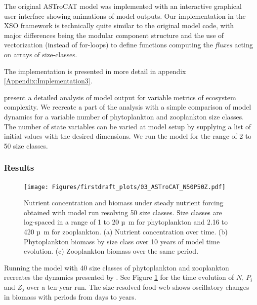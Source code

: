 \documentclass[journal abbreviation, manuscript]{copernicus}
\begin{document}
The original ASTroCAT model was implemented with an interactive graphical user interface showing animations of model outputs. Our implementation in the XSO framework is technically quite similar to the original model code, with major differences being the modular component structure and the use of vectorization (instead of for-loops) to define functions computing the \textit{fluxes} acting on arrays of size-classes.

The implementation is presented in more detail in appendix \ref{Appendix:Implementation3}.

\citet{Banas2011b} present a detailed analysis of model output for variable metrics of ecosystem complexity. We recreate a part of the analysis with a simple comparison of model dynamics for a variable number of phytoplankton and zooplankton size classes. The number of state variables can be varied at model setup by supplying a list of initial values with the desired dimensions. We run the model for the range of 2 to 50 size classes.

\subsubsection{Results}
\begin{figure}[t]
\texttt{[image: Figures/firstdraft\_plots/03\_ASTroCAT\_N50P50Z.pdf]}
\caption{Nutrient concentration and biomass under steady nutrient forcing obtained with model run resolving 50 size classes. Size classes are log-spaced in a range of 1 to 20 \unit{µ m} for phytoplankton and 2.16 to 420 \unit{µ m} for zooplankton. (a) Nutrient concentration over time. (b) Phytoplankton biomass by size class over 10 years of model time evolution. (c) Zooplankton biomass over the same period.}
\label{Figure:ResultsASTroCAT_1}
\end{figure}

Running the model with 40 size classes of phytoplankton and zooplankton recreates the dynamics presented by \citet{Banas2011b}. See Figure \ref{Figure:ResultsASTroCAT_1} for the time evolution of $N$, $P_i$ and $Z_j$ over a ten-year run. The size-resolved food-web shows oscillatory changes in biomass with periods from days to years.
\end{document}

